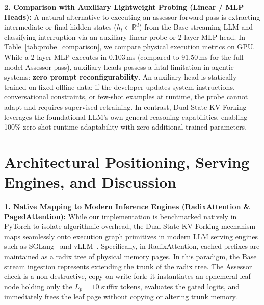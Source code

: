\documentclass{article}
\begin{document}
\textbf{2. Comparison with Auxiliary Lightweight Probing (Linear / MLP Heads):}
A natural alternative to executing an assessor forward pass is extracting intermediate or final hidden states ($h_t \in \mathbb{R}^d$) from the Base streaming LLM and classifying interruption via an auxiliary linear probe or 2-layer MLP head. In Table~\ref{tab:probe_comparison}, we compare physical execution metrics on GPU.
While a 2-layer MLP executes in $0.103$\,ms (compared to $91.50$\,ms for the full-model Assessor pass), auxiliary heads possess a fatal limitation in agentic systems: \textbf{zero prompt reconfigurability}. An auxiliary head is statically trained on fixed offline data; if the developer updates system instructions, conversational constraints, or few-shot examples at runtime, the probe cannot adapt and requires supervised retraining. In contrast, Dual-State KV-Forking leverages the foundational LLM's own general reasoning capabilities, enabling 100\% zero-shot runtime adaptability with zero additional trained parameters.

\begin{table}[h]
\centering
\caption{\textbf{Comparison: Auxiliary Lightweight Probing vs. Dual-State Assessor (Qwen 3 4B).}}
\label{tab:probe_comparison}
\vspace{0.2cm}
\end{table}

\section{Architectural Positioning, Serving Engines, and Discussion}

\textbf{1. Native Mapping to Modern Inference Engines (RadixAttention \& PagedAttention):}
While our implementation is benchmarked natively in PyTorch to isolate algorithmic overhead, the Dual-State KV-Forking mechanism maps seamlessly onto execution graph primitives in modern LLM serving engines such as SGLang~\citep{zheng2023sglang} and vLLM~\citep{kwon2023vllm}. Specifically, in RadixAttention, cached prefixes are maintained as a radix tree of physical memory pages. In this paradigm, the Base stream ingestion represents extending the trunk of the radix tree. The Assessor check is a non-destructive, copy-on-write fork: it instantiates an ephemeral leaf node holding only the $L_p = 10$ suffix tokens, evaluates the gated logits, and immediately frees the leaf page without copying or altering trunk memory.
\end{document}

